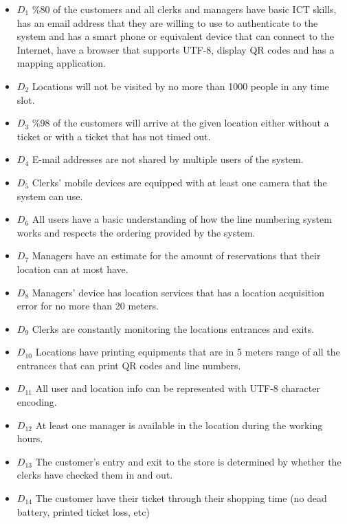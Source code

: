 \begin{itemize}
    \item \textbf{$D_1$} \%80 of the customers and all clerks and managers have basic ICT skills, has an email address that they are willing to use to authenticate to the system and has a smart phone or equivalent device that can connect to the Internet, have a browser that supports UTF-8, display QR codes and has a mapping application. %
    \item \textbf{$D_2$} Locations will not be visited by no more than 1000 people in any time slot. %
    \item \textbf{$D_3$} \%98 of the customers will arrive at the given location either without a ticket or with a ticket that has not timed out. %
    \item \textbf{$D_4$} E-mail addresses are not shared by multiple users of the system. %
    \item \textbf{$D_5$} Clerks' mobile devices are equipped with at least one camera that the system can use. %
    \item \textbf{$D_6$} All users have a basic understanding of how the line numbering system works and respects the ordering provided by the system. %
    \item \textbf{$D_7$} Managers have an estimate for the amount of reservations that their location can at most have. %
    \item \textbf{$D_8$} Managers' device has location services that has a location acquisition error for no more than 20 meters. %
    \item \textbf{$D_9$} Clerks are constantly monitoring the locations entrances and exits. %
    \item \textbf{$D_{10}$} Locations have printing equipments that are in 5 meters range of all the entrances that can print QR codes and line numbers. %
    \item \textbf{$D_{11}$} All user and location info can be represented with UTF-8 character encoding. %
    \item \textbf{$D_{12}$} At least one manager is available in the location during the working hours. %
    \item \textbf{$D_{13}$} The customer's entry and exit to the store is determined by whether the clerks have checked them in and out.
    \item \textbf{$D_{14}$} The customer have their ticket through their shopping time (no dead battery, printed ticket loss, etc) %
\end{itemize}
